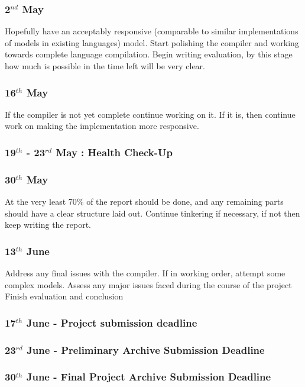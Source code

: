 \subsubsection{2$^{nd}$ May}    
Hopefully have an acceptably responsive (comparable to similar implementations of models in existing languages) model. Start polishing the compiler and working towards complete language compilation. Begin writing evaluation, by this stage how much is possible in the time left will be very clear.
\subsubsection{16$^{th}$ May} 
If the compiler is not yet complete continue working on it. If it is, then continue work on making the implementation more responsive. 
\subsubsection{19$^{th}$ - 23$^{rd}$ May : Health Check-Up}     
\subsubsection{30$^{th}$ May}     
At the very least 70\% of the report should be done, and any remaining parts should have a clear structure laid out. Continue tinkering if necessary, if not then keep writing the report.
\subsubsection{13$^{th}$ June}     
Address any final issues with the compiler. If in working order, attempt some complex models. Assess any major issues faced during the course of the project
Finish evaluation and conclusion
\subsubsection{17$^{th}$ June - Project submission deadline} 
\subsubsection{23$^{rd}$ June - Preliminary Archive Submission Deadline}     
\subsubsection{30$^{th}$ June - Final Project Archive Submission Deadline}     

